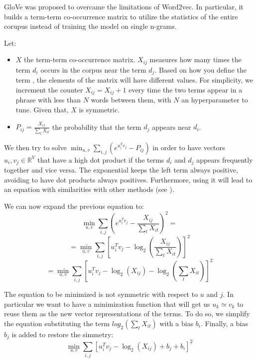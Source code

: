 GloVe was proposed to overcame the limitations of Word2vec.
In particular, it builds a term-term co-occurrence matrix
to utilize the statistics of the entire corupus
instead of training the model on single n-grams.

Let:
\begin{itemize}
    \item $X$ the term-term co-occurrence matrix.
          $X_{ij}$ measures how many times the term $d_i$ occurs in the corpus near
          the term $d_j$. Based on how you define the term ,
          the elements of the matrix will have different values.
          For simplicity, we increment the counter $X_{ij} = X_{ij} + 1$ every time the
          two terms appear in a phrase with less than $N$ words between them, with $N$ an
          hyperparameter to tune. Given that, $X$ is symmetric.
    \item $P_{ij} = \frac{X_{ij}}{\sum_t X_{it}}$ the probability that the term $d_j$ appears
          near $d_i$.
\end{itemize}

We then try to solve $\min_{u,v} \sum_{i,j} (e^{u_i^T v_j} - P_{ij})$
in order to have vectors $u_i, v_j \in \mathbb{R}^V$ that have a high dot product if the terms $d_i$ and $d_j$
appears frequently together and vice versa.
The exponential keeps the left term always positive, avoiding to have dot products always positives.
Furthermore, using it will lead to an equation with similarities with other methods (see \cite{pennington2014glove}).

We can now expand the previous equation to:
$$\min_{u,v} \sum_{i,j} (e^{u_i^T v_j} - \frac{X_{ij}}{\sum_t X_{it}})^2 =$$
$$= \min_{u,v} \sum_{i,j} [u_i^T v_j - \log_2(\frac{X_{ij}}{\sum_t X_{it}})]^2$$
$$= \min_{u,v} \sum_{i,j} [u_i^T v_j - \log_2(X_{ij}) - \log_2(\sum_t X_{it})]^2$$

The equation to be minimized is not symmetric with respect to $u$ and $j$.
In particular we want to have a minimization function that will get us $u_k \simeq v_k$
to reuse them as the new vector representations of the terms.
To do so, we simplify the equation substituting the term $log_2(\sum_t X_{it})$ with a bias $b_i$.
Finally, a bias $b_j$ is added to restore the simmetry:
$$ \min_{u,v} \sum_{i,j} [u_i^T v_j - \log_2(X_{ij}) + b_j + b_i]^2 $$

